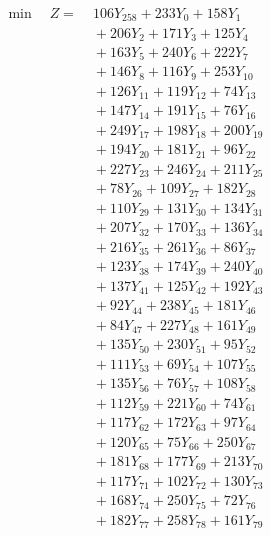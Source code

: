 \documentclass[a4paper,10pt]{article}
\begin{document}
\allowdisplaybreaks
{\small
\begin{align}
\min \quad Z = &\; 106 Y_{258} + 233 Y_{0} + 158 Y_{1} \\[0.3ex]
&\;  + 206 Y_{2} + 171 Y_{3} + 125 Y_{4} \\[0.3ex]
&\;  + 163 Y_{5} + 240 Y_{6} + 222 Y_{7} \\[0.3ex]
&\;  + 146 Y_{8} + 116 Y_{9} + 253 Y_{10} \\[0.3ex]
&\;  + 126 Y_{11} + 119 Y_{12} + 74 Y_{13} \\[0.3ex]
&\;  + 147 Y_{14} + 191 Y_{15} + 76 Y_{16} \\[0.3ex]
&\;  + 249 Y_{17} + 198 Y_{18} + 200 Y_{19} \\[0.3ex]
&\;  + 194 Y_{20} + 181 Y_{21} + 96 Y_{22} \\[0.3ex]
&\;  + 227 Y_{23} + 246 Y_{24} + 211 Y_{25} \\[0.3ex]
&\;  + 78 Y_{26} + 109 Y_{27} + 182 Y_{28} \\[0.5ex]\allowbreak
&\;  + 110 Y_{29} + 131 Y_{30} + 134 Y_{31} \\[0.3ex]
&\;  + 207 Y_{32} + 170 Y_{33} + 136 Y_{34} \\[0.3ex]
&\;  + 216 Y_{35} + 261 Y_{36} + 86 Y_{37} \\[0.3ex]
&\;  + 123 Y_{38} + 174 Y_{39} + 240 Y_{40} \\[0.3ex]
&\;  + 137 Y_{41} + 125 Y_{42} + 192 Y_{43} \\[0.3ex]
&\;  + 92 Y_{44} + 238 Y_{45} + 181 Y_{46} \\[0.3ex]
&\;  + 84 Y_{47} + 227 Y_{48} + 161 Y_{49} \\[0.3ex]
&\;  + 135 Y_{50} + 230 Y_{51} + 95 Y_{52} \\[0.3ex]
&\;  + 111 Y_{53} + 69 Y_{54} + 107 Y_{55} \\[0.3ex]
&\;  + 135 Y_{56} + 76 Y_{57} + 108 Y_{58} \\[0.5ex]\allowbreak
&\;  + 112 Y_{59} + 221 Y_{60} + 74 Y_{61} \\[0.3ex]
&\;  + 117 Y_{62} + 172 Y_{63} + 97 Y_{64} \\[0.3ex]
&\;  + 120 Y_{65} + 75 Y_{66} + 250 Y_{67} \\[0.3ex]
&\;  + 181 Y_{68} + 177 Y_{69} + 213 Y_{70} \\[0.3ex]
&\;  + 117 Y_{71} + 102 Y_{72} + 130 Y_{73} \\[0.3ex]
&\;  + 168 Y_{74} + 250 Y_{75} + 72 Y_{76} \\[0.3ex]
&\;  + 182 Y_{77} + 258 Y_{78} + 161 Y_{79} \\[0.3ex]

\end{align}}
\end{document}
